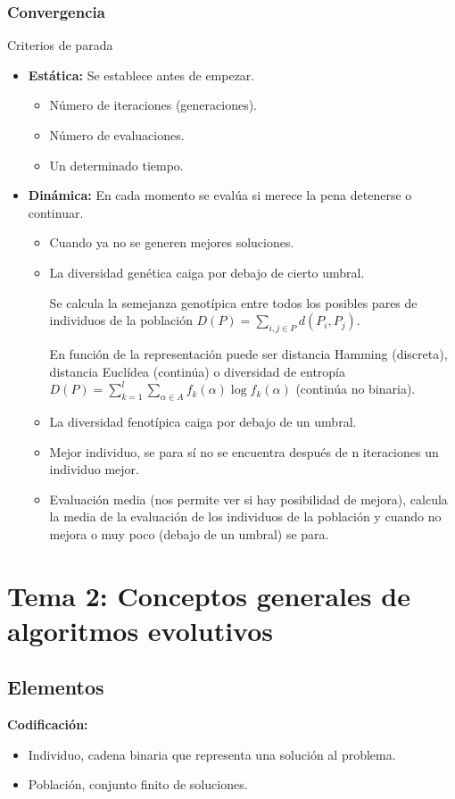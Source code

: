 \documentclass[12pt, twoside, openright]{report} %
\begin{document}
\subsection{Convergencia}
Criterios de parada
\begin{itemize}
	\item \textbf{Estática:} Se establece antes de empezar.
	      \begin{itemize}
		      \item Número de iteraciones (generaciones).
		      \item Número de evaluaciones.
		      \item Un determinado tiempo.
	      \end{itemize}
	\item \textbf{Dinámica:} En cada momento se evalúa si merece la pena detenerse o continuar.
	      \begin{itemize}
		      \item Cuando ya no se generen mejores soluciones.
		      \item La diversidad genética caiga por debajo de cierto umbral.

		            Se calcula la semejanza genotípica entre todos los posibles pares de individuos de la población $D(P)=\sum_{i,j\in P} d(P_i, P_j)$.

		            En función de la representación puede ser distancia Hamming (discreta), distancia Euclídea (continúa) o diversidad de entropía $D(P)=\sum_{k=1}^l\sum_{\alpha \in A} f_k(\alpha)\log f_k(\alpha)$ (continúa no binaria).
		      \item La diversidad fenotípica caiga por debajo de un umbral.
		      \item Mejor individuo, se para sí no se encuentra después de n iteraciones un individuo mejor.
		      \item Evaluación media (nos permite ver si hay posibilidad de mejora), calcula la media de la evaluación de los individuos de la población y cuando no mejora o muy poco (debajo de un umbral) se para.
	      \end{itemize}
\end{itemize}

\chapter{Tema 2: Conceptos generales de algoritmos evolutivos}
\section{Elementos}
\textbf{Codificación:}
\begin{itemize}
	\item Individuo, cadena binaria que representa una solución al problema.
	\item Población, conjunto finito de soluciones.
\end{itemize}
\end{document}
